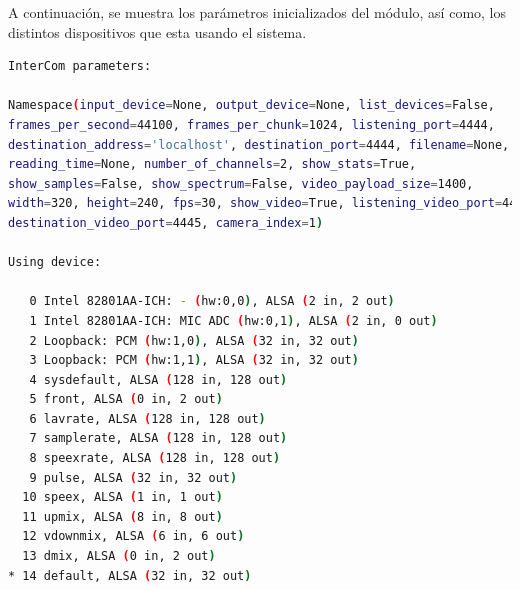 A continuación, se muestra los parámetros inicializados del módulo, así como, los distintos dispositivos que esta usando el sistema.
\begin{lstlisting}[language=bash,basicstyle=\ttfamily\scriptsize]
InterCom parameters:

Namespace(input_device=None, output_device=None, list_devices=False, 
frames_per_second=44100, frames_per_chunk=1024, listening_port=4444, 
destination_address='localhost', destination_port=4444, filename=None, 
reading_time=None, number_of_channels=2, show_stats=True, 
show_samples=False, show_spectrum=False, video_payload_size=1400, 
width=320, height=240, fps=30, show_video=True, listening_video_port=4445, 
destination_video_port=4445, camera_index=1)

Using device:

   0 Intel 82801AA-ICH: - (hw:0,0), ALSA (2 in, 2 out)
   1 Intel 82801AA-ICH: MIC ADC (hw:0,1), ALSA (2 in, 0 out)
   2 Loopback: PCM (hw:1,0), ALSA (32 in, 32 out)
   3 Loopback: PCM (hw:1,1), ALSA (32 in, 32 out)
   4 sysdefault, ALSA (128 in, 128 out)
   5 front, ALSA (0 in, 2 out)
   6 lavrate, ALSA (128 in, 128 out)
   7 samplerate, ALSA (128 in, 128 out)
   8 speexrate, ALSA (128 in, 128 out)
   9 pulse, ALSA (32 in, 32 out)
  10 speex, ALSA (1 in, 1 out)
  11 upmix, ALSA (8 in, 8 out)
  12 vdownmix, ALSA (6 in, 6 out)
  13 dmix, ALSA (0 in, 2 out)
* 14 default, ALSA (32 in, 32 out)
\end{lstlisting}


